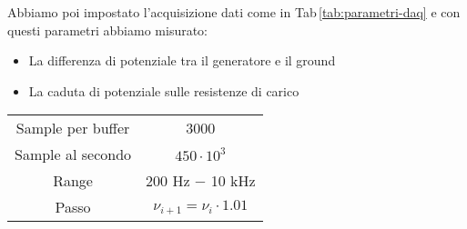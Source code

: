 \documentclass[../Relazione_circuiti]{subfiles}
\begin{document}
%
%
%
%

  
  \begin{minipage}{0.49\textwidth}
    Abbiamo poi impostato l'acquisizione dati come in Tab\,\ref{tab:parametri-daq} e con questi parametri abbiamo
    misurato:
    \begin{itemize}
      \item La differenza di potenziale tra il generatore e il ground
      \item La caduta di potenziale sulle resistenze di carico
    \end{itemize}

  \end{minipage} \hfill
  \begin{minipage}{0.49\textwidth}

    \centering
    \begin{minipage}{0.85\textwidth}
      \centering
      \begin{tabular}{|c|c|}
        \hline
        Sample per buffer & 3000                           \\
        Sample al secondo & $ 450 \cdot 10^3 $                 \\
        Range             & 200 Hz − 10 kHz                \\
        Passo             & $\nu_{i+1} = \nu_i \cdot 1.01$ \\ \hline
      \end{tabular}

      \label{tab:parametri-daq}
    \end{minipage}

  \end{minipage} \\
\end{document}
